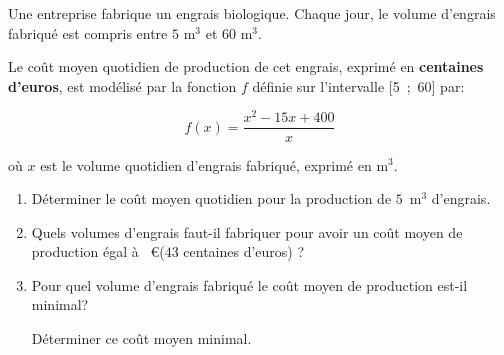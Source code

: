 \medskip
 
Une entreprise fabrique un engrais biologique. Chaque jour, le volume d'engrais fabriqué est compris entre $5$ m$^3$ et 60 m$^3$.

Le coût moyen quotidien de production de cet engrais, exprimé en \textbf{centaines d'euros}, est modélisé par la fonction $f$ définie sur l'intervalle [5~;~60] par:

\[f(x) = \dfrac{x^2- 15x +400}{x}\]

où $x$ est le volume quotidien d'engrais fabriqué, exprimé en m$^3$.

\medskip

\begin{enumerate}
\item Déterminer le coût moyen quotidien pour la production de $5$~m$^3$ d'engrais.
\item Quels volumes d'engrais faut-il fabriquer pour avoir un coût moyen de
production égal à ~\euro{}($43$ centaines d'euros) ?
\item Pour quel volume d'engrais fabriqué le coût moyen de production est-il
minimal? 

Déterminer ce coût moyen minimal.
\end{enumerate}
